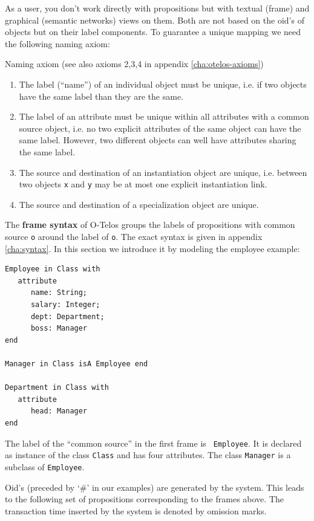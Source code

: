 As a user, you don't work directly with propositions but with textual
(frame) and graphical (semantic networks) views on them. Both are not based
on the oid's of objects but on their label components. To guarantee a
unique mapping we need the following naming axiom:

\begin{axiom}{Naming axiom (see also axioms 2,3,4 in appendix \ref{cha:otelos-axioms})}
 \begin{enumerate}
  \item The label (``name'') of an individual object must be
  unique, i.e. if two objects have the same label than they are the same.
  \item The label of an attribute must be unique within all
  attributes with a common source object, i.e. no two explicit attributes
  of the same object can have the same label. However, two different objects
  can well have attributes sharing the same label.
  \item The source and destination of an instantiation object are unique, i.e. between
  two objects {\tt x} and {\tt y} may be at most one explicit instantiation link.
  \item The source and destination of a specialization object are unique.
 \end{enumerate}
\end{axiom}

The {\bf frame syntax} of O-Telos groups the labels of propositions with common
source {\tt o} around the label of {\tt o}. The exact syntax is given in appendix \ref{cha:syntax}.
In this section we introduce it by modeling the employee example:


\begin{verbatim}
Employee in Class with
   attribute
      name: String;
      salary: Integer;
      dept: Department;
      boss: Manager
end

Manager in Class isA Employee end

Department in Class with
   attribute
      head: Manager
end
\end{verbatim}


The label of the ``common source'' in the first frame is {\tt
  Employee}. It is declared as instance of the class {\tt Class} and has four
attributes. The class {\tt Manager} is a subclass of {\tt Employee}.

Oid's (preceded by `\#' in our examples) are generated by the system. This
leads to the following set of propositions corresponding to the frames
above. The transaction time inserted by the system is denoted by omission marks.


